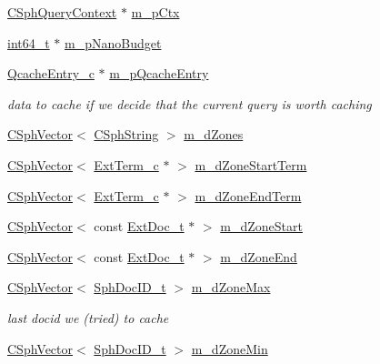 \begin{DoxyCompactItemize}
\hyperlink{classCSphQueryContext}{C\-Sph\-Query\-Context} $\ast$ \hyperlink{classExtRanker__c_a3e10f29cfe7a8d7b327aa511a801582f}{m\-\_\-p\-Ctx}
\item 
\hyperlink{sphinxstd_8h_a996e72f71b11a5bb8b3b7b6936b1516d}{int64\-\_\-t} $\ast$ \hyperlink{classExtRanker__c_a6e94067c0956f1699ba0d72d60bd83e2}{m\-\_\-p\-Nano\-Budget}
\item 
\hyperlink{classQcacheEntry__c}{Qcache\-Entry\-\_\-c} $\ast$ \hyperlink{classExtRanker__c_a888956042764154d8c4660c424da374b}{m\-\_\-p\-Qcache\-Entry}
\begin{DoxyCompactList}\small\item\em data to cache if we decide that the current query is worth caching \end{DoxyCompactList}\item 
\hyperlink{classCSphVector}{C\-Sph\-Vector}$<$ \hyperlink{structCSphString}{C\-Sph\-String} $>$ \hyperlink{classExtRanker__c_a1447a96a5591d3b9767378022314a51e}{m\-\_\-d\-Zones}
\item 
\hyperlink{classCSphVector}{C\-Sph\-Vector}$<$ \hyperlink{classExtTerm__c}{Ext\-Term\-\_\-c} $\ast$ $>$ \hyperlink{classExtRanker__c_ad7bbd6f95f33d5b7ddb23c3d34b7fb3c}{m\-\_\-d\-Zone\-Start\-Term}
\item 
\hyperlink{classCSphVector}{C\-Sph\-Vector}$<$ \hyperlink{classExtTerm__c}{Ext\-Term\-\_\-c} $\ast$ $>$ \hyperlink{classExtRanker__c_a1f1ec276103eee4f4aa0d40b3d318f01}{m\-\_\-d\-Zone\-End\-Term}
\item 
\hyperlink{classCSphVector}{C\-Sph\-Vector}$<$ const \hyperlink{structExtDoc__t}{Ext\-Doc\-\_\-t} $\ast$ $>$ \hyperlink{classExtRanker__c_abdc100a25d83c3994ffcde130917982e}{m\-\_\-d\-Zone\-Start}
\item 
\hyperlink{classCSphVector}{C\-Sph\-Vector}$<$ const \hyperlink{structExtDoc__t}{Ext\-Doc\-\_\-t} $\ast$ $>$ \hyperlink{classExtRanker__c_a841e4fb58cc64a88327fb6faaa57ca79}{m\-\_\-d\-Zone\-End}
\item 
\hyperlink{classCSphVector}{C\-Sph\-Vector}$<$ \hyperlink{sphinx_8h_a3176771631c12a9e4897272003e6b447}{Sph\-Doc\-I\-D\-\_\-t} $>$ \hyperlink{classExtRanker__c_a7674e99116553ceb507030ea548d5728}{m\-\_\-d\-Zone\-Max}
\begin{DoxyCompactList}\small\item\em last docid we (tried) to cache \end{DoxyCompactList}\item 
\hyperlink{classCSphVector}{C\-Sph\-Vector}$<$ \hyperlink{sphinx_8h_a3176771631c12a9e4897272003e6b447}{Sph\-Doc\-I\-D\-\_\-t} $>$ \hyperlink{classExtRanker__c_a8a82c2ae9386d302221a30b191b9f33b}{m\-\_\-d\-Zone\-Min}

\end{DoxyCompactItemize}
